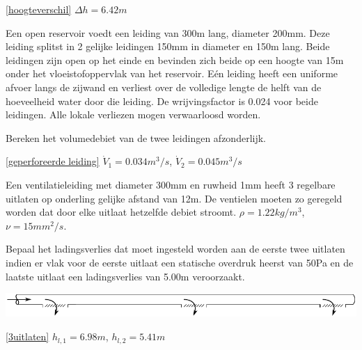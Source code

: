 \begin{antwoord}{\ref{hoogteverschil}}
	$\Delta h = 6.42\unit{m}$
\end{antwoord}
\begin{toepassing}
	\label{geperforeerde leiding}
Een open reservoir voedt een leiding van 300m lang, diameter 200mm. Deze leiding splitst in 2 gelijke leidingen 150mm in diameter en 150m lang. Beide leidingen zijn open op het einde en bevinden zich beide op een hoogte van 15m onder het vloeistofoppervlak van het reservoir. Eén leiding heeft een uniforme afvoer langs de zijwand en verliest over de volledige lengte de helft van de hoeveelheid water door die leiding. De wrijvingsfactor is 0.024 voor beide leidingen. Alle lokale verliezen mogen verwaarloosd worden.
		
Bereken het volumedebiet van de twee leidingen afzonderlijk. 
\end{toepassing}
\begin{antwoord}{\ref{geperforeerde leiding}}
	$\dot{V}_1 = 0.034\unit{m^3/s}$, $\dot{V}_2 = 0.045\unit{m^3/s}$
\end{antwoord}
\begin{toepassing}
	\label{3uitlaten}
Een ventilatieleiding met diameter 300mm en ruwheid 1mm heeft 3 regelbare uitlaten op onderling gelijke afstand van 12m. De ventielen moeten zo geregeld worden dat door elke uitlaat hetzelfde debiet stroomt. $\rho = 1.22\unit{kg/m^3}$, $\nu = 15\unit{mm^2/s}$.
	
Bepaal het ladingsverlies dat moet ingesteld worden aan de eerste twee uitlaten indien er vlak voor de eerste uitlaat een statische overdruk heerst van 50Pa en de laatste uitlaat een ladingsverlies van 5.00m veroorzaakt.

	\centering
	\includegraphics{fig/leidingnetwerken/3uitlaten}
\end{toepassing}
\begin{antwoord}{\ref{3uitlaten}}
	$h_{l,1} = 6.98\unit{m}$, $h_{l,2} = 5.41\unit{m}$
\end{antwoord}
